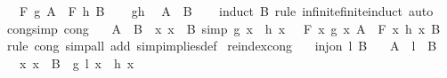 \begin{isabellebody}
\ \ \ {\isachardoublequoteopen}F\ g\ A\ {\isacharequal}{\kern0pt}\ F\ h\ B{\isachardoublequoteclose}\isanewline
%
\isadelimproof
\ \ %
\endisadelimproof
%
\isatagproof
{}\isamarkupfalse%
\ g{\isacharunderscore}{\kern0pt}h\ \isamarkupfalse%
\ {\isacartoucheopen}A\ {\isacharequal}{\kern0pt}\ B{\isacartoucheclose}\isanewline
\ \ \isamarkupfalse%
\ {\isacharparenleft}{\kern0pt}induct\ B\ rule{\isacharcolon}{\kern0pt}\ infinite{\isacharunderscore}{\kern0pt}finite{\isacharunderscore}{\kern0pt}induct{\isacharparenright}{\kern0pt}\ auto%
\endisatagproof
{\isafoldproof}%
%
\isadelimproof
\isanewline
%
\endisadelimproof
\isanewline
{}\isamarkupfalse%
\ cong{\isacharunderscore}{\kern0pt}simp\ {\isacharbrackleft}{\kern0pt}cong{\isacharbrackright}{\kern0pt}{\isacharcolon}{\kern0pt}\isanewline
\ \ {\isachardoublequoteopen}{\isasymlbrakk}\ A\ {\isacharequal}{\kern0pt}\ B{\isacharsemicolon}{\kern0pt}\ \ {\isasymAnd}x{\isachardot}{\kern0pt}\ x\ {\isasymin}\ B\ {\isacharequal}{\kern0pt}simp{\isacharequal}{\kern0pt}{\isachargreater}{\kern0pt}\ g\ x\ {\isacharequal}{\kern0pt}\ h\ x\ {\isasymrbrakk}\ {\isasymLongrightarrow}\ F\ {\isacharparenleft}{\kern0pt}{\isasymlambda}x{\isachardot}{\kern0pt}\ g\ x{\isacharparenright}{\kern0pt}\ A\ {\isacharequal}{\kern0pt}\ F\ {\isacharparenleft}{\kern0pt}{\isasymlambda}x{\isachardot}{\kern0pt}\ h\ x{\isacharparenright}{\kern0pt}\ B{\isachardoublequoteclose}\isanewline
%
\isadelimproof
%
\endisadelimproof
%
\isatagproof
{}\isamarkupfalse%
\ {\isacharparenleft}{\kern0pt}rule\ cong{\isacharparenright}{\kern0pt}\ {\isacharparenleft}{\kern0pt}simp{\isacharunderscore}{\kern0pt}all\ add{\isacharcolon}{\kern0pt}\ simp{\isacharunderscore}{\kern0pt}implies{\isacharunderscore}{\kern0pt}def{\isacharparenright}{\kern0pt}%
\endisatagproof
{\isafoldproof}%
%
\isadelimproof
\isanewline
%
\endisadelimproof
\isanewline
{}\isamarkupfalse%
\ reindex{\isacharunderscore}{\kern0pt}cong{\isacharcolon}{\kern0pt}\isanewline
\ \ \ {\isachardoublequoteopen}inj{\isacharunderscore}{\kern0pt}on\ l\ B{\isachardoublequoteclose}\isanewline
\ \ \ {\isachardoublequoteopen}A\ {\isacharequal}{\kern0pt}\ l\ {\isacharbackquote}{\kern0pt}\ B{\isachardoublequoteclose}\isanewline
\ \ \ {\isachardoublequoteopen}{\isasymAnd}x{\isachardot}{\kern0pt}\ x\ {\isasymin}\ B\ {\isasymLongrightarrow}\ g\ {\isacharparenleft}{\kern0pt}l\ x{\isacharparenright}{\kern0pt}\ {\isacharequal}{\kern0pt}\ h\ x{\isachardoublequoteclose}\isanewline

\end{isabellebody}
